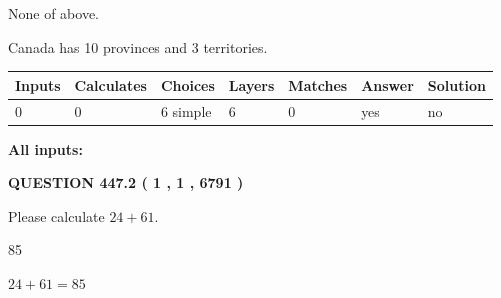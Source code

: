 \documentclass[12pt]{article}
\begin{document}
 
 None of above.
 
 
\noindent{}
 
 
Canada has 10  provinces and 3 territories.
 
 
\noindent{}
 
 
   
   
   
   
\noindent\begin{tabular}{|l|l|l|l|l|l|l|}
 \hline
Inputs & Calculates & Choices & Layers & Matches & Answer & Solution \\ \hline
 0  & 
 0  & 
 6
  simple  
  & 
 6  & 
 0  & 
  yes & 
  no 
  \\ \hline
 \end{tabular}
   
   
   
   
\noindent{}
   
   
   
   
\noindent\vspace{0.1in}\hspace{-0.08in} {\textbf{\Large{All inputs: }}}
   
   
  
\vspace{0.2in}
  
{\textbf{\Large{QUESTION
447.2 
 ( 1 , 1 , 6791 )
}}}
  
  
 
Please calculate $ %
24 +  %
61 $.
 
 
 
\noindent{}
 
 

85
 
 
\noindent{}
 
 

 
 
 
\noindent{}
 
 

$ %
24 +  %
61=   %
85$
 
\end{document}
